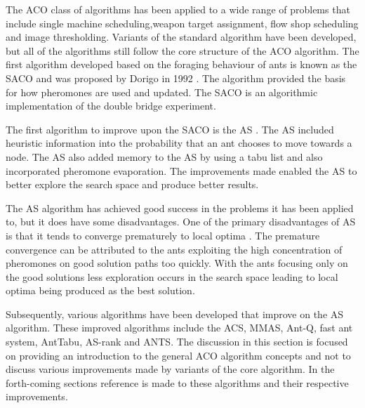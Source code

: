  The \gls{ACO} class of algorithms has been applied to a wide range of problems that include single machine scheduling\cite{ACOSingleMachine},weapon target assignment\cite{WeaponTargetACO}, flow shop scheduling\cite{ACOFlowShop} and image thresholding\cite{ACOImageThreshold}. Variants of the standard algorithm have been developed, but all of the algorithms still follow the core structure of the \gls{ACO} algorithm\cite{CompuIntelligenceIntro,FundamentalSwarm}.
The first algorithm developed based on the foraging behaviour of ants is known as the \gls{SACO} and was proposed by Dorigo in 1992 \cite{CompuIntelligenceIntro}. The algorithm provided the basis for how pheromones are used and updated. The \gls{SACO} is an algorithmic implementation of the double bridge experiment.

The first algorithm to improve upon the \gls{SACO} is the \gls{AS} \cite{CompuIntelligenceIntro,AntIntroTrends}. The \gls{AS} included heuristic information into the probability that an ant chooses to move towards a node. The \gls{AS} also added memory to the \gls{AS} by using a tabu list and also incorporated pheromone evaporation. The improvements made enabled the \gls{AS} to better explore the search space and produce better results\cite{CompuIntelligenceIntro,AntIntroTrends}. 

The \gls{AS} algorithm has achieved good success in the problems it has been applied to, but it does have some disadvantages\cite{ImpACOComplex,ACOSurvey}. One of the primary disadvantages of \gls{AS} is that it tends to converge prematurely to local optima \cite{FundamentalSwarm,ImpACOComplex}. The premature convergence can be attributed to the ants exploiting the high concentration of pheromones on good solution paths too quickly\cite{FundamentalSwarm}. With the ants focusing only on the good solutions less exploration occurs in the search space leading to local optima being produced as the best solution\cite{FundamentalSwarm}.

Subsequently, various algorithms have been developed that improve on the \gls{AS} algorithm. These improved algorithms include the \gls{ACS}, \gls{MMAS}, Ant-Q, fast ant system, AntTabu, \gls{AS}-rank and \gls{ANTS}\cite{CompuIntelligenceIntro,AntIntroTrends}. The discussion in this section is focused on providing an introduction to the general \gls{ACO} algorithm concepts and not to discuss various improvements made by variants of the core algorithm. In the forth-coming sections reference is made to these algorithms and their respective improvements.

